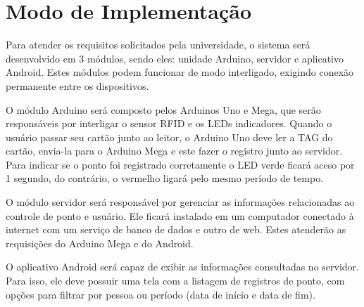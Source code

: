 \section{Modo de Implementação}

Para atender os requisitos solicitados pela universidade, o sistema será desenvolvido em 3 módulos, sendo eles: unidade Arduino, servidor e aplicativo Android. Estes módulos podem funcionar de modo interligado, exigindo conexão permanente entre os dispositivos.

O módulo Arduino será composto pelos Arduinos Uno e Mega, que serão responsáveis por interligar o sensor RFID e os LEDs indicadores. Quando o usuário passar seu cartão junto ao leitor, o Arduino Uno deve ler a TAG do cartão, envia-la para o Arduino Mega e este fazer o registro junto ao servidor. Para indicar se o ponto foi registrado corretamente o LED verde ficará aceso por 1 segundo, do contrário, o vermelho ligará pelo mesmo período de tempo.

O módulo servidor será responsável por gerenciar as informações relacionadas ao controle de ponto e usuário. Ele ficará instalado em um computador conectado à internet com um serviço de banco de dados e outro de web. Estes atenderão as requisições do Arduino Mega e do Android.

O aplicativo Android será capaz de exibir as informações consultadas no servidor. Para isso, ele deve possuir uma tela com a listagem de registros de ponto, com opções para filtrar por pessoa ou período (data de início e data de fim).